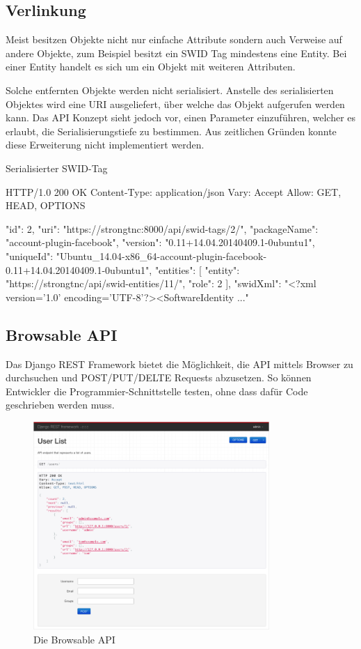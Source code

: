 \subsection{Verlinkung}
Meist besitzen Objekte nicht nur einfache Attribute sondern auch Verweise auf
andere Objekte, zum Beispiel besitzt ein SWID Tag mindestens eine Entity. Bei
einer Entity handelt es sich um ein Objekt mit weiteren Attributen.

Solche entfernten Objekte werden nicht serialisiert. Anstelle des serialisierten
Objektes wird eine URI ausgeliefert, über welche das Objekt aufgerufen werden
kann. Das API Konzept sieht jedoch vor, einen Parameter einzuführen, welcher es
erlaubt, die Serialisierungstiefe zu bestimmen. Aus zeitlichen Gründen konnte
diese Erweiterung nicht implementiert werden.

\begin{listing}
\caption{Serialisierter SWID-Tag}
\begin{httpcode}
HTTP/1.0 200 OK
Content-Type: application/json
Vary: Accept
Allow: GET, HEAD, OPTIONS

{
    "id": 2, 
    "uri": "https://strongtnc:8000/api/swid-tags/2/", 
    "packageName": "account-plugin-facebook", 
    "version": "0.11+14.04.20140409.1-0ubuntu1", 
    "uniqueId": "Ubuntu_14.04-x86_64-account-plugin-facebook-0.11+14.04.20140409.1-0ubuntu1", 
    "entities": [
        {
            "entity": "https://strongtnc/api/swid-entities/11/", 
            "role": 2
        }
    ], 
    "swidXml": "<?xml version='1.0' encoding='UTF-8'?>\n<SoftwareIdentity ..."
}
\end{httpcode}
\end{listing}

\subsection{Browsable API}

Das Django REST Framework bietet die Möglichkeit, die API mittels Browser zu
durchsuchen und POST/PUT/DELTE Requests abzusetzen. So können Entwickler die
Programmier-Schnittstelle testen, ohne dass dafür Code geschrieben werden muss.

\begin{figure}[H]
	\centering
	\includegraphics[width=0.8\textwidth]{images/drf-browsable}
	\caption{Die Browsable API}
\end{figure}

